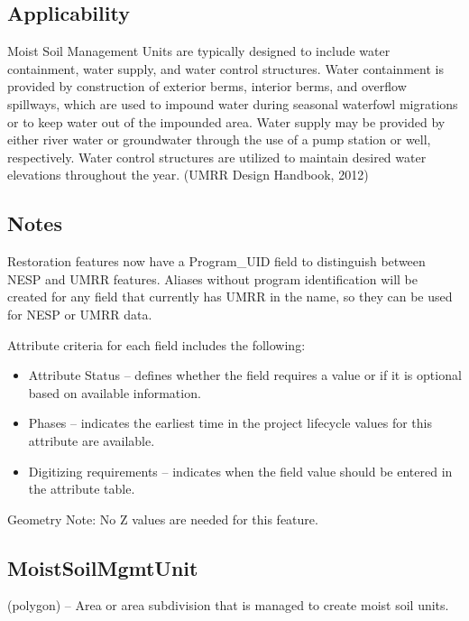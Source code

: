 \documentclass[
  letterpaper,
  DIV=11,
  numbers=noendperiod]{scrreprt}
\providecommand{\tightlist}{%
  \setlength{\itemsep}{0pt}\setlength{\parskip}{0pt}}
\begin{document}
\subsection{Applicability}\label{applicability-8}

Moist Soil Management Units are typically designed to include water
containment, water supply, and water control structures. Water
containment is provided by construction of exterior berms, interior
berms, and overflow spillways, which are used to impound water during
seasonal waterfowl migrations or to keep water out of the impounded
area. Water supply may be provided by either river water or groundwater
through the use of a pump station or well, respectively. Water control
structures are utilized to maintain desired water elevations throughout
the year. (UMRR Design Handbook, 2012)

\subsection{Notes}\label{notes-10}

Restoration features now have a Program\_UID field to distinguish
between NESP and UMRR features. Aliases without program identification
will be created for any field that currently has UMRR in the name, so
they can be used for NESP or UMRR data.

Attribute criteria for each field includes the following:

\begin{itemize}
\tightlist
\item
  Attribute Status -- defines whether the field requires a value or if
  it is optional based on available information.
\item
  Phases -- indicates the earliest time in the project lifecycle values
  for this attribute are available.
\item
  Digitizing requirements -- indicates when the field value should be
  entered in the attribute table.
\end{itemize}

Geometry Note: No Z values are needed for this feature.

\subsection{MoistSoilMgmtUnit}\label{moistsoilmgmtunit}

(polygon) -- Area or area subdivision that is managed to create moist
soil units.
\end{document}
